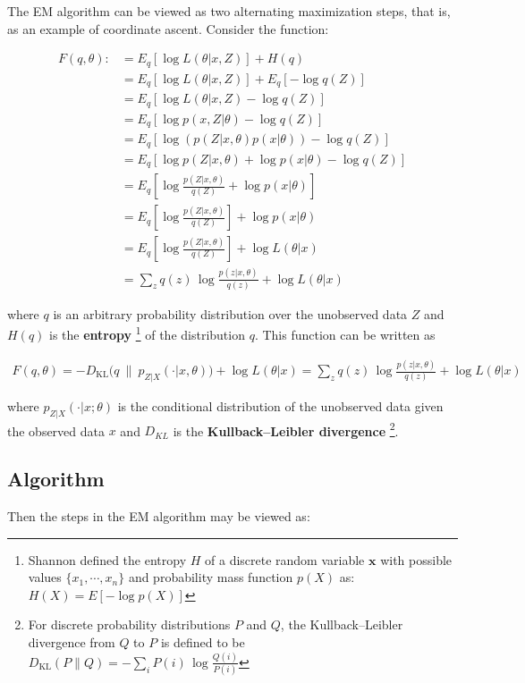The EM algorithm can be viewed as two alternating maximization steps, that is, as an example of coordinate ascent. Consider the function:
\begin{scriptsize}
\begin{align*}
	\displaystyle F(q,\theta ):
	&=E_{q}[\log L(\theta | x,Z)]+H(q)\\
	&=E_{q}[\log L(\theta | x,Z)]+E_q[-\log q(Z)]\\
	&=E_{q}[\log L(\theta | x,Z)-\log q(Z)]\\
	&=E_{q}[\log p(x,Z | \theta)-\log q(Z)]\\
	&=E_{q}[\log (p(Z|x,\theta) p(x |\theta))-\log q(Z)]\\
	&=E_{q}[\log p(Z|x,\theta) + \log p(x |\theta)-\log q(Z)]\\
	&=E_{q}\left[\log \frac{p(Z|x,\theta)}{q(Z)}+\log p(x |\theta)\right]\\
	&=E_{q}\left[\log \frac{p(Z|x,\theta)}{q(Z)}\right]+\log p(x |\theta)\\
	&=E_{q}\left[\log \frac{p(Z|x,\theta)}{q(Z)}\right]+\log L(\theta|x)\\
	&=\sum _{z}q(z)\,\log{\frac {p(z|x,\theta)}{q(z)}}+\log L(\theta|x)
\end{align*}
\end{scriptsize}
where $q$ is an arbitrary probability distribution over the unobserved data $Z$ and $H(q)$ is the \textbf{entropy}
	\footnote{Shannon defined the entropy $Η$ of a discrete random variable $\boldsymbol x$ with possible values $\{x_1,\cdots,x_n\}$ and probability mass function $p(X)$ as: $H(X)=E[-\log p(X)]$}
of the distribution $q$. This function can be written as
\begin{scriptsize}
\begin{align*}
 	\displaystyle F(q,\theta )
 	=-D_{\mathrm {KL} }\big(q{~\big\|~}p_{Z|X}(\cdot | x,\theta )\big)+\log L(\theta|x)=\sum _{z}q(z)\,\log{\frac {p(z|x,\theta)}{q(z)}}+\log L(\theta|x)
\end{align*}
\end{scriptsize}
where $\displaystyle p_{Z|X}(\cdot |x;\theta )$ is the conditional distribution of the unobserved data given the observed data $x$ and $D_{KL}$ is the \textbf{Kullback--Leibler divergence}
	\footnote{For discrete probability distributions $P$ and $Q$, the Kullback–Leibler divergence from $Q$ to $P$ is defined to be $\displaystyle D_{\mathrm {KL} }(P\|Q)=-\sum _{i}P(i)\,\log {\frac {Q(i)}{P(i)}}$
	}.

\subsection{Algorithm}
Then the steps in the EM algorithm may be viewed as:
 
